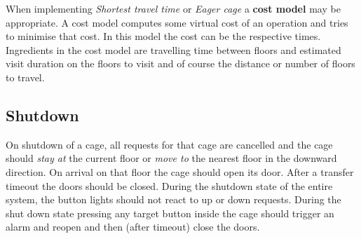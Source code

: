 When implementing \textit{Shortest travel time} or \textit{Eager cage}
a \textbf{cost model} may be appropriate. A cost model computes some
virtual cost of an operation and tries to minimise that cost. In this
model the cost can be the respective times. Ingredients in the cost
model are travelling time between floors and estimated visit duration
on the floors to visit and of course the distance or number of floors
to travel.

\subsection{Shutdown}
On shutdown of a cage, all requests for that cage are cancelled and
the cage should \textit{stay at} the current floor or \textit{move to}
the nearest floor in the downward direction. 
On arrival on that floor the cage should open its door. After a 
transfer timeout the doors should be closed. During the shutdown state
of the entire system, the button lights should not react to up or down
requests. During the shut down state pressing any target button inside the
cage should trigger an alarm and reopen and then (after timeout) close
the doors.

